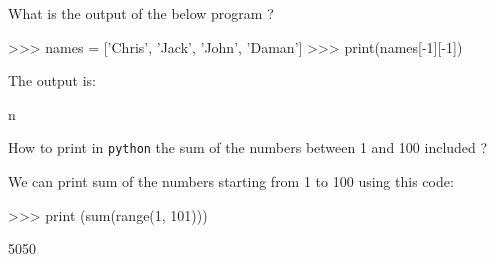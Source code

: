 \documentclass[12pt,a4paper]{exam}
\begin{document}
\begin{questions}

\question What is the output of the below program ?
\begin{ipython}
>>> names = ['Chris', 'Jack', 'John', 'Daman']
>>> print(names[-1][-1])
\end{ipython}
\begin{solution}
The output is: 
\begin{ioutput}
n
\end{ioutput}
\end{solution}

%
%
%
%

\question
How to print in \texttt{python} the sum of the numbers between 1 and 100 included ?
\makeemptybox{3cm}

\begin{solution}
We can print sum of the numbers starting from 1 to 100 using this code:

\begin{ipython}
>>> print (sum(range(1, 101)))
\end{ipython}
\begin{ioutput}
5050
\end{ioutput}
\end{solution}


\end{questions}
\end{document}
